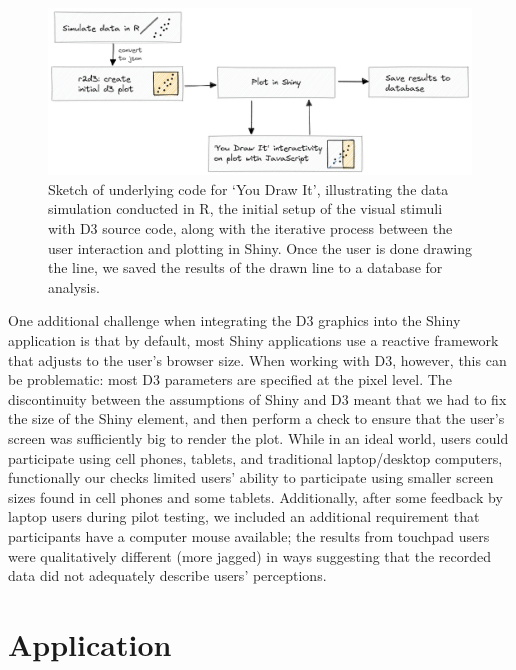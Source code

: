 \documentclass[
]{jds}
\begin{document}
\begin{figure}

{\centering \includegraphics{images/code-sketch-2.png}

}

\caption{\label{fig-you-draw-it-code-sketch}Sketch of underlying code
for `You Draw It', illustrating the data simulation conducted in R, the
initial setup of the visual stimuli with D3 source code, along with the
iterative process between the user interaction and plotting in Shiny.
Once the user is done drawing the line, we saved the results of the
drawn line to a database for analysis.}

\end{figure}

One additional challenge when integrating the D3 graphics into the Shiny
application is that by default, most Shiny applications use a reactive
framework that adjusts to the user's browser size. When working with D3,
however, this can be problematic: most D3 parameters are specified at
the pixel level. The discontinuity between the assumptions of Shiny and
D3 meant that we had to fix the size of the Shiny element, and then
perform a check to ensure that the user's screen was sufficiently big to
render the plot. While in an ideal world, users could participate using
cell phones, tablets, and traditional laptop/desktop computers,
functionally our checks limited users' ability to participate using
smaller screen sizes found in cell phones and some tablets.
Additionally, after some feedback by laptop users during pilot testing,
we included an additional requirement that participants have a computer
mouse available; the results from touchpad users were qualitatively
different (more jagged) in ways suggesting that the recorded data did
not adequately describe users' perceptions.

\hypertarget{application}{%
\section{Application}\label{application}}
\end{document}
